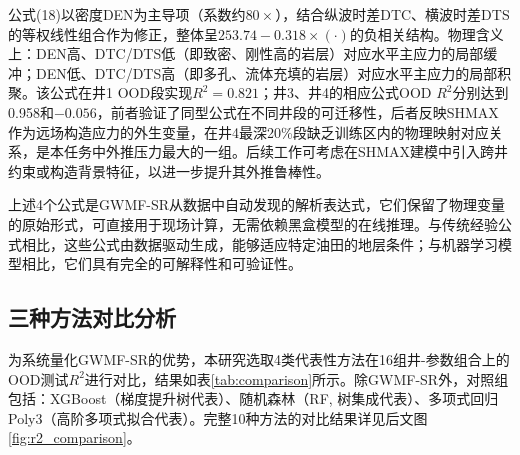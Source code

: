 \documentclass[a4paper,12pt]{ctexart}
\begin{document}
公式(18)以密度DEN为主导项（系数约$80\times$），结合纵波时差DTC、横波时差DTS的等权线性组合作为修正，整体呈$253.74 - 0.318\times(\cdot)$的负相关结构。物理含义上：DEN高、DTC/DTS低（即致密、刚性高的岩层）对应水平主应力的局部缓冲；DEN低、DTC/DTS高（即多孔、流体充填的岩层）对应水平主应力的局部积聚。该公式在井1 OOD段实现$R^2=0.821$；井3、井4的相应公式OOD $R^2$分别达到0.958和$-0.056$，前者验证了同型公式在不同井段的可迁移性，后者反映SHMAX作为远场构造应力的外生变量，在井4最深20\%段缺乏训练区内的物理映射对应关系，是本任务中外推压力最大的一组。后续工作可考虑在SHMAX建模中引入跨井约束或构造背景特征，以进一步提升其外推鲁棒性。

\vspace{0.5em}

上述4个公式是GWMF-SR从数据中自动发现的解析表达式，它们保留了物理变量的原始形式，可直接用于现场计算，无需依赖黑盒模型的在线推理。与传统经验公式相比，这些公式由数据驱动生成，能够适应特定油田的地层条件；与机器学习模型相比，它们具有完全的可解释性和可验证性。

\subsection{三种方法对比分析}

为系统量化GWMF-SR的优势，本研究选取4类代表性方法在16组井-参数组合上的OOD测试$R^2$进行对比，结果如表\ref{tab:comparison}所示。除GWMF-SR外，对照组包括：XGBoost（梯度提升树代表）、随机森林（RF, 树集成代表）、多项式回归Poly3（高阶多项式拟合代表）。完整10种方法的对比结果详见后文图\ref{fig:r2_comparison}。
\end{document}

